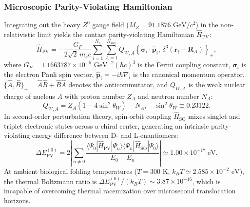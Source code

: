 \documentclass[11pt,onecolumn]{article}
\begin{document}
\subsubsection{Microscopic Parity-Violating Hamiltonian}
Integrating out the heavy $Z^0$ gauge field ($M_Z = 91.1876\text{ GeV}/c^2$) in the non-relativistic limit yields the contact parity-violating Hamiltonian $\hat{H}_{\mathrm{PV}}$:
\begin{equation}
\hat{H}_{\mathrm{PV}} = -\frac{G_F}{2\sqrt{2}\,m_e c} \sum_{i=1}^{N_e} \sum_{A=1}^{N_{\mathrm{nuc}}} Q_{W,A} \left\{ \boldsymbol{\sigma}_i \cdot \hat{\mathbf{p}}_i,\, \delta^3(\mathbf{r}_i - \mathbf{R}_A) \right\}_+,
\label{eq:hpv_micro}
\end{equation}
where $G_F = 1.1663787 \times 10^{-5}\text{ GeV}^{-2}(\hbar c)^3$ is the Fermi coupling constant, $\boldsymbol{\sigma}_i$ is the electron Pauli spin vector, $\hat{\mathbf{p}}_i = -i\hbar\nabla_i$ is the canonical momentum operator, $\{\hat{A}, \hat{B}\}_+ = \hat{A}\hat{B} + \hat{B}\hat{A}$ denotes the anticommutator, and $Q_{W,A}$ is the weak nuclear charge of nucleus $A$ with proton number $Z_A$ and neutron number $N_A$:
\begin{equation}
Q_{W,A} = Z_A\left(1 - 4\sin^2\theta_W\right) - N_A, \quad \sin^2\theta_W \equiv 0.23122.
\end{equation}
In second-order perturbation theory, spin-orbit coupling $\hat{H}_{\mathrm{SO}}$ mixes singlet and triplet electronic states across a chiral center, generating an intrinsic parity-violating energy difference between D- and L-enantiomers:
\begin{equation}
\Delta E_{\mathrm{PV}}^{(0)} = 2\left|\sum_{n \neq 0} \frac{\langle \Psi_0 | \hat{H}_{\mathrm{PV}} | \Psi_n \rangle \langle \Psi_n | \hat{H}_{\mathrm{SO}} | \Psi_0 \rangle}{E_0 - E_n}\right| \simeq 1.00 \times 10^{-17}\;\mathrm{eV}.
\end{equation}
At ambient biological folding temperatures ($T = 300\text{ K}$, $k_B T \simeq 2.585 \times 10^{-2}\text{ eV}$), the thermal Boltzmann ratio is $\Delta E_{\mathrm{PV}}^{(0)} / (k_B T) \sim 3.87 \times 10^{-16}$, which is incapable of overcoming thermal racemization over microsecond translocation horizons.
\end{document}
